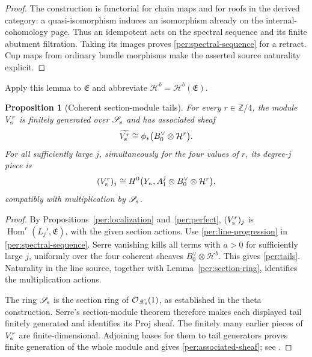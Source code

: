 \documentclass[11pt]{article}
\newtheorem{proposition}[theorem]{Proposition}
\theoremstyle{definition}
\theoremstyle{remark}
\newcommand{\Z}{\mathbb Z}
\DeclareMathOperator{\Hom}{Hom}
\newcommand{\cO}{\mathcal O}
\numberwithin{equation}{section}
\begin{document}
\begin{proof}
The construction is functorial for chain maps and for roofs in
the derived category: a quasi-isomorphism induces an isomorphism
already on the internal-cohomology page.  Thus an idempotent acts
on the spectral sequence and its finite abutment filtration.
Taking its images proves \eqref{per:spectral-sequence} for a
retract.  Cup maps from ordinary bundle morphisms make the asserted
source naturality explicit.
\end{proof}

Apply this lemma to $\mathfrak E$ and abbreviate
$\mathcal H^b=\mathcal H^b(\mathfrak E)$.

\begin{proposition}[Coherent section-module tails]
\label{per:finite-generation}
For every $r\in\Z/4$, the module $V_{\rm s}^r$ is finitely generated
over $\mathscr S_{\rm s}$ and has associated sheaf
\begin{equation}
 \widetilde{V_{\rm s}^r}
   \cong\phi_*\bigl(B_0^\vee\otimes\mathcal H^r\bigr).
 \label{per:associated-sheaf}
\end{equation}
For all sufficiently large $j$, simultaneously for the four values
of $r$, its degree-$j$ piece is
\begin{equation}
 (V_{\rm s}^r)_j
  \cong H^0\bigl(Y_\kappa,
       A_1^j\otimes B_0^\vee\otimes\mathcal H^r\bigr),
 \label{per:tails}
\end{equation}
compatibly with multiplication by $\mathscr S_{\rm s}$.
\end{proposition}

\begin{proof}
By Propositions~\ref{per:localization} and~\ref{per:perfect},
$(V_{\rm s}^r)_j$ is $\Hom^r(L_j',\mathfrak E)$, with the given
section actions.  Use \eqref{per:line-progression} in
\eqref{per:spectral-sequence}.  Serre vanishing kills all terms
with $a>0$ for sufficiently large $j$, uniformly over the four
coherent sheaves $B_0^\vee\otimes\mathcal H^b$.  This gives
\eqref{per:tails}.  Naturality in the line source, together with
Lemma~\ref{per:section-ring}, identifies the multiplication actions.

The ring $\mathscr S_{\rm s}$ is the section ring of
$\cO_{\mathscr X_{\rm s}}(1)$, as established in the theta
construction.  Serre's section-module theorem therefore makes
each displayed tail finitely generated and identifies its Proj
sheaf.  The finitely many earlier pieces of $V_{\rm s}^r$ are
finite-dimensional.  Adjoining bases for them to tail generators
proves finite generation of the whole module and gives
\eqref{per:associated-sheaf}; see \cite{serre-proj}.
\end{proof}
\end{document}

